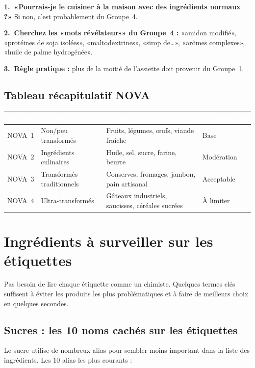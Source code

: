 \documentclass[a5paper,12pt,oneside,openany]{book}
\begin{document}
\textbf{1.~«Pourrais-je le cuisiner à la maison avec des ingrédients normaux ?»}
Si non, c'est probablement du Groupe~4.

\textbf{2.~Cherchez les «mots révélateurs» du Groupe~4 :} «amidon modifié»,
«protéines de soja isolées», «maltodextrines», «sirop de\ldots», «arômes
complexes», «huile de palme hydrogénée».

\textbf{3.~Règle pratique :} plus de la moitié de l'assiette doit provenir
du Groupe~1.

\section{Tableau récapitulatif NOVA}

{\small
\begin{tabularx}{\textwidth}{|l|L|L|l|}
\hline
{}
  \textcolor{white}{\textbf{Groupe}}
  & \textcolor{white}{\textbf{Définition}}
  & \textcolor{white}{\textbf{Exemples}}
  & \textcolor{white}{\textbf{Alimentation}} \\
\hline
NOVA~1 & Non/peu transformés & Fruits, légumes, œufs, viande fraîche & Base \\
\hline
NOVA~2 & Ingrédients culinaires & Huile, sel, sucre, farine, beurre & Modération \\
\hline
NOVA~3 & Transformés traditionnels & Conserves, fromages, jambon, pain artisanal & Acceptable \\
\hline
NOVA~4 & Ultra-transformés & Gâteaux industriels, saucisses, céréales sucrées & À limiter \\
\hline
\end{tabularx}
}

\chapter{Ingrédients à surveiller sur les étiquettes}

Pas besoin de lire chaque étiquette comme un chimiste. Quelques termes clés
suffisent à éviter les produits les plus problématiques et à faire de meilleurs
choix en quelques secondes.

\section{Sucres : les 10 noms cachés sur les étiquettes}

Le sucre utilise de nombreux alias pour sembler moins important dans la liste
des ingrédients. Les 10 alias les plus courants :
\end{document}
